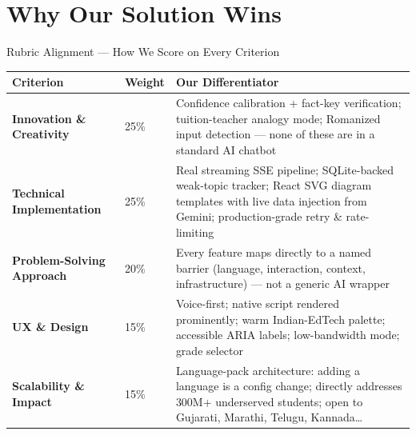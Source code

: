 \documentclass[aspectratio=169, 12pt]{beamer}
\begin{document}
\section{Why Our Solution Wins}

\begin{frame}{Rubric Alignment --- How We Score on Every Criterion}
  \renewcommand{\arraystretch}{1.6}
  \begin{tabular}{>{\small\bfseries}p{}
                  >{\centering\arraybackslash\small}p{}
                  >{\small}p{}}
    \toprule
    \rowcolor{deepgreen!15}
    Criterion & Weight & Our Differentiator\\
    \midrule
    Innovation \& Creativity
      & 25\%
      & Confidence calibration + fact-key verification; tuition-teacher
        analogy mode; Romanized input detection --- none of these are
        in a standard AI chatbot\\
    \rowcolor{lightgreen!15}
    Technical Implementation
      & 25\%
      & Real streaming SSE pipeline; SQLite-backed weak-topic tracker;
        React SVG diagram templates with live data injection from Gemini;
        production-grade retry \& rate-limiting\\
    Problem-Solving Approach
      & 20\%
      & Every feature maps directly to a named barrier (language,
        interaction, context, infrastructure) ---
        not a generic AI wrapper\\
    \rowcolor{lightgreen!15}
    UX \& Design
      & 15\%
      & Voice-first; native script rendered prominently;
        warm Indian-EdTech palette; accessible ARIA labels;
        low-bandwidth mode; grade selector\\
    Scalability \& Impact
      & 15\%
      & Language-pack architecture: adding a language is a config change;
        directly addresses 300M+ underserved students;
        open to Gujarati, Marathi, Telugu, Kannada\ldots\\
    \bottomrule
  \end{tabular}
\end{frame}
\end{document}
